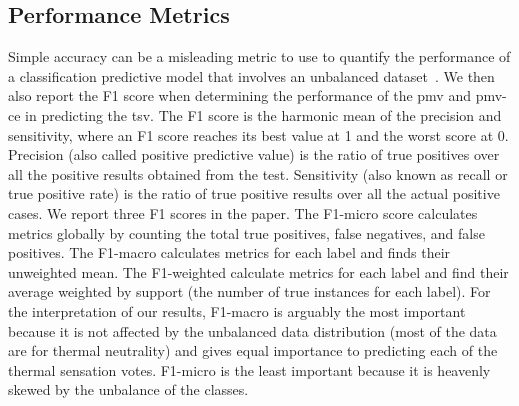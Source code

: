 \subsection{Performance Metrics}\label{subsec:performance-metrics}
Simple accuracy can be a misleading metric to use to quantify the performance of a classification predictive model that involves an unbalanced dataset~\cite{Chawla2005}.
We then also report the F1 score when determining the performance of the \ac{pmv} and \ac{pmv-ce} in predicting the \ac{tsv}.
The F1 score is the harmonic mean of the precision and sensitivity, where an F1 score reaches its best value at 1 and the worst score at 0.
Precision (also called positive predictive value) is the ratio of true positives over all the positive results obtained from the test. 
Sensitivity (also known as recall or true positive rate) is the ratio of true positive results over all the actual positive cases.
We report three F1 scores in the paper.
The F1-micro score calculates metrics globally by counting the total true positives, false negatives, and false positives.
The F1-macro calculates metrics for each label and finds their unweighted mean.
The F1-weighted calculate metrics for each label and find their average weighted by support (the number of true instances for each label).
For the interpretation of our results, F1-macro is arguably the most important because it is not affected by the unbalanced data distribution (most of the data are for thermal neutrality) and gives equal importance to predicting each of the thermal sensation votes. 
F1-micro is the least important because it is heavenly skewed by the unbalance of the classes.